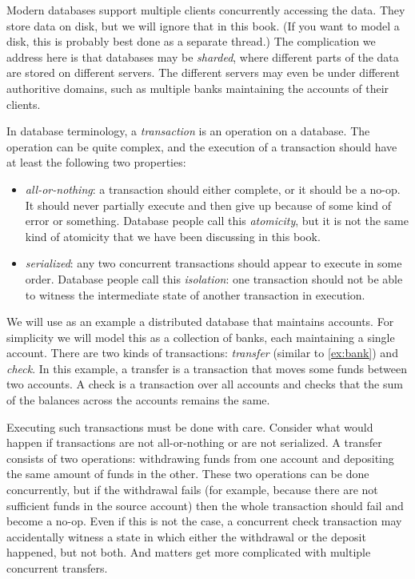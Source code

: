 \documentclass{report}
\begin{document}
Modern databases support multiple clients concurrently accessing the data.
They store data on disk, but we will ignore that in this book.
(If you want to model a disk, this is probably best done as a separate
thread.)
The complication we address here is that databases may be \emph{sharded},
where different parts of the data are stored on different servers.
The different servers may even be under different
authoritive domains, such as multiple banks maintaining the accounts of their
clients.

In database terminology, a \emph{transaction} is an operation on a database.
The operation can be quite complex, and the execution of a transaction
should have at least the following two properties:
\begin{itemize}
\item \emph{all-or-nothing}: a transaction should either complete, or it should
be a no-op.  It should never partially execute and then give up because of
some kind of error or something.  Database
people call this \emph{atomicity}, but it is not the same kind of atomicity that
we have been discussing in this book.
\item \emph{serialized}: any two concurrent transactions should appear to
execute in some order.  Database people call this \emph{isolation}: one transaction
should not be able to witness the intermediate state of another transaction
in execution.
\end{itemize}

We will use as an example a distributed database that maintains accounts.
For simplicity we will model this as a collection of banks, each maintaining a
single account.  There are two kinds of transactions: \emph{transfer}
(similar to \autoref{ex:bank}) and \emph{check}.  In this example, a transfer
is a transaction that moves some funds between two accounts.
A check is a transaction over all accounts and checks that the sum of the
balances across the accounts remains the same.

Executing such transactions must be done with care.  Consider what
would happen if transactions are not all-or-nothing or are not
serialized.  A transfer consists of two operations: withdrawing
funds from one account and depositing the same amount of funds in
the other.  These two operations can be done concurrently, but if
the withdrawal fails (for example, because there are not sufficient
funds in the source account) then the whole transaction should fail
and become a no-op.  Even if this is not the case, a concurrent
check transaction may accidentally witness a state in which either
the withdrawal or the deposit happened, but not both.  And matters
get more complicated with multiple concurrent transfers.
\end{document}

